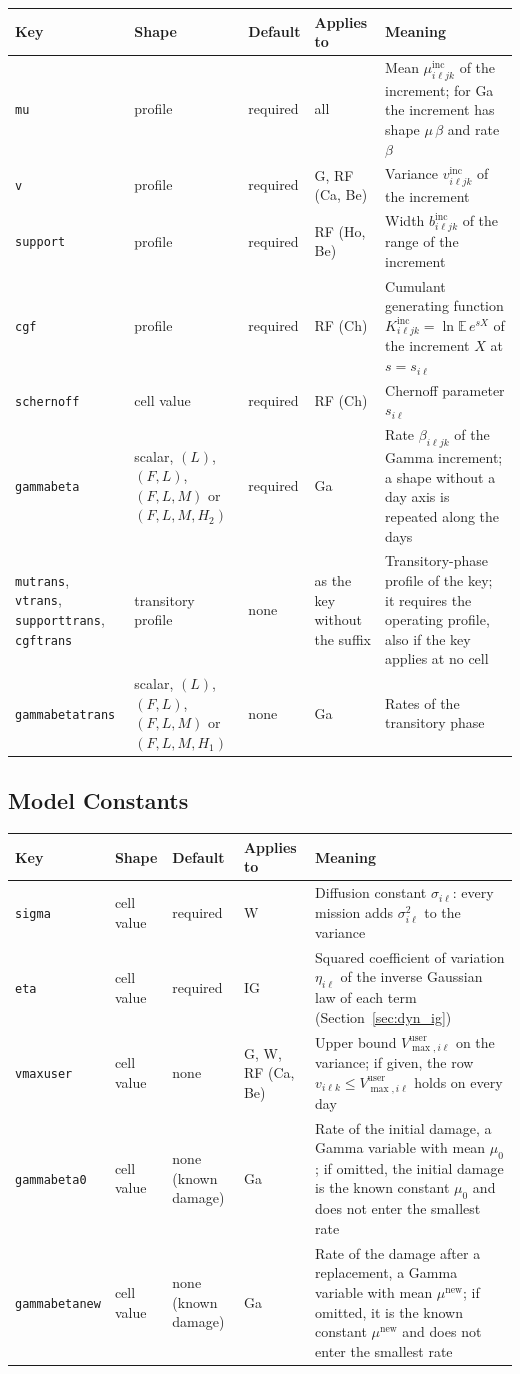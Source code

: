 \documentclass[11pt,a4paper]{article}
\makeatletter
\theoremstyle{plain}
\theoremstyle{definition}
\newcommand{\inc}{\mathrm{inc}}
\newcommand{\new}{\mathrm{new}}
\renewcommand{\_}{\textunderscore\allowbreak{}}
\providecommand{\keyrow}[5]{{\raggedright #1\par} & {\raggedright #2\par} & {\raggedright #3\par} & {\raggedright #4\par} & {\raggedright #5\par} \\}
\providecommand{\tabstart}[2]{\begingroup\small\begin{longtable}{@{}#1@{}}\toprule #2 \\ \midrule \endhead}
\providecommand{\tabend}{\bottomrule\end{longtable}\endgroup}
\providecommand{\keytab}{\tabstart{p{3.2cm}p{2.2cm}p{1.8cm}p{1.9cm}p{4.5cm}}{Key & Shape & Default & Applies to & Meaning}}
\makeatother
\begin{document}
\keytab
\keyrow{\texttt{mu}}{profile}{required}{all}{Mean $\mu^{\inc}_{i\ell jk}$ of the increment; for Ga the increment has shape $\mu\,\beta$ and rate $\beta$}
\keyrow{\texttt{v}}{profile}{required}{G, RF (Ca, Be)}{Variance $v^{\inc}_{i\ell jk}$ of the increment}
\keyrow{\texttt{support}}{profile}{required}{RF (Ho, Be)}{Width $b^{\inc}_{i\ell jk}$ of the range of the increment}
\keyrow{\texttt{cgf}}{profile}{required}{RF (Ch)}{Cumulant generating function $K^{\inc}_{i\ell jk} = \ln \mathbb{E}\,e^{s X}$ of the increment $X$ at $s = s_{i\ell}$}
\keyrow{\texttt{s\_chernoff}}{cell value}{required}{RF (Ch)}{Chernoff parameter $s_{i\ell}$}
\keyrow{\texttt{gamma\_beta}}{scalar, $(L)$, $(F, L)$, $(F, L, M)$ or $(F, L, M, H_2)$}{required}{Ga}{Rate $\beta_{i\ell jk}$ of the Gamma increment; a shape without a day axis is repeated along the days}
\keyrow{\texttt{mu\_trans}, \texttt{v\_trans}, \texttt{support\_trans}, \texttt{cgf\_trans}}{transitory profile}{none}{as the key without the suffix}{Transitory-phase profile of the key; it requires the operating profile, also if the key applies at no cell}
\keyrow{\texttt{gamma\_beta\_trans}}{scalar, $(L)$, $(F, L)$, $(F, L, M)$ or $(F, L, M, H_1)$}{none}{Ga}{Rates of the transitory phase}
\tabend

\subsection{Model Constants}\label{sec:input_constants}

\keytab
\keyrow{\texttt{sigma}}{cell value}{required}{W}{Diffusion constant $\sigma_{i\ell}$: every mission adds $\sigma_{i\ell}^2$ to the variance}
\keyrow{\texttt{eta}}{cell value}{required}{IG}{Squared coefficient of variation $\eta_{i\ell}$ of the inverse Gaussian law of each term (Section~\ref{sec:dyn_ig})}
\keyrow{\texttt{v\_max\_user}}{cell value}{none}{G, W, RF (Ca, Be)}{Upper bound $V^{\mathrm{user}}_{\max,i\ell}$ on the variance; if given, the row $v_{i\ell k} \le V^{\mathrm{user}}_{\max,i\ell}$ holds on every day}
\keyrow{\texttt{gamma\_beta\_0}}{cell value}{none (known damage)}{Ga}{Rate of the initial damage, a Gamma variable with mean $\mu_0$; if omitted, the initial damage is the known constant $\mu_0$ and does not enter the smallest rate}
\keyrow{\texttt{gamma\_beta\_new}}{cell value}{none (known damage)}{Ga}{Rate of the damage after a replacement, a Gamma variable with mean $\mu^{\new}$; if omitted, it is the known constant $\mu^{\new}$ and does not enter the smallest rate}
\tabend
\end{document}
